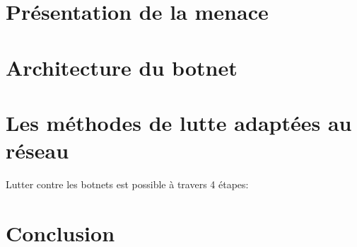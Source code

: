 \documentclass[a4paper]{article}
\newcommand{\localpath}{}
\begin{document}


\section{Présentation de la menace}







	


\section{Architecture du botnet}





\section{Les méthodes de lutte adaptées au réseau}
Lutter contre les botnets est possible à travers 4 étapes:





\newpage\section{Conclusion}
 
\end{document}
